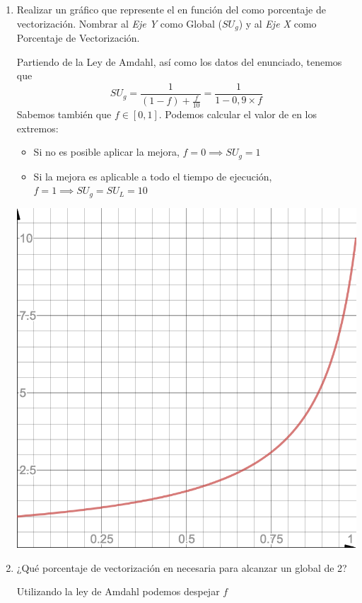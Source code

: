 \threeemdash
\begin{enumerate}
 \item Realizar un gráfico que represente el \SU en función del como porcentaje de vectorización. Nombrar al \textit{Eje Y} como \SU Global ($SU_g$) y al \textit{Eje X} como Porcentaje de Vectorización.

 Partiendo de la Ley de Amdahl, así como los datos del enunciado, tenemos que $$ SU_g = \frac{1}{(1-f) + \frac{f}{10}} = \frac{1}{1 - 0,9 \times f}$$
 Sabemos también que $ f \in [0, 1] $. Podemos calcular el valor de \SU en los extremos:
 \begin{itemize}
 \item Si no es posible aplicar la mejora, $f = 0 \implies SU_g = 1$
 \item Si la mejora es aplicable a todo el tiempo de ejecución, $ f = 1 \implies SU_g = SU_L = 10 $
 \end{itemize}

 \includegraphics[scale=0.5]{gfx/amdahl_resuelto_1.png}
 
 \threeemdash

 \item ¿Qué porcentaje de vectorización en necesaria para alcanzar un \SU global de 2?

 Utilizando la ley de Amdahl podemos despejar $f$


\end{enumerate}
